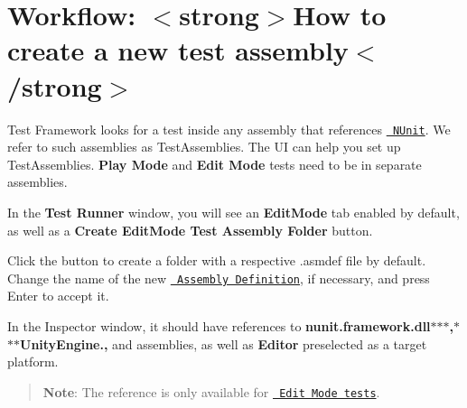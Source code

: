 \chapter{Workflow\+: \texorpdfstring{$<$}{<}strong\texorpdfstring{$>$}{>}How to create a new test assembly\texorpdfstring{$<$}{<}/strong\texorpdfstring{$>$}{>}}
\hypertarget{md__hey_tea_9_2_library_2_package_cache_2com_8unity_8test-framework_0d1_81_833_2_documentation_04872722a20000e06b1b28d5347f2329d}{}\label{md__hey_tea_9_2_library_2_package_cache_2com_8unity_8test-framework_0d1_81_833_2_documentation_04872722a20000e06b1b28d5347f2329d}
\label{md__hey_tea_9_2_library_2_package_cache_2com_8unity_8test-framework_0d1_81_833_2_documentation_04872722a20000e06b1b28d5347f2329d_autotoc_md4385}%
%
  Test Framework looks for a test inside any assembly that references \href{http://www.nunit.org/}{\texttt{ NUnit}}. We refer to such assemblies as {\ttfamily Test\+Assemblies}. The  UI can help you set up {\ttfamily Test\+Assemblies}. {\bfseries{Play Mode}} and {\bfseries{Edit Mode}} tests need to be in separate assemblies.

In the {\bfseries{Test Runner}} window, you will see an {\bfseries{Edit\+Mode}} tab enabled by default, as well as a {\bfseries{Create Edit\+Mode Test Assembly Folder}} button.



Click the button to create a {\itshape {}} folder with a respective .asmdef file by default. Change the name of the new \href{https://docs.unity3d.com/Manual/ScriptCompilationAssemblyDefinitionFiles.html}{\texttt{ Assembly Definition}}, if necessary, and press Enter to accept it.



In the Inspector window, it should have references to {\bfseries{nunit.\+framework.\+dll\texorpdfstring{$\ast$}{*}\texorpdfstring{$\ast$}{*}\texorpdfstring{$\ast$}{*},\texorpdfstring{$\ast$}{*} \texorpdfstring{$\ast$}{*}\texorpdfstring{$\ast$}{*}\+Unity\+Engine.,}} and {\bfseries{}} assemblies, as well as {\bfseries{Editor}} preselected as a target platform.

\begin{quote}
{\bfseries{Note}}\+: The {\bfseries{}} reference is only available for \href{./edit-mode-vs-play-mode-tests.md\#edit-mode-tests}{\texttt{ Edit Mode tests}}. \end{quote}


 